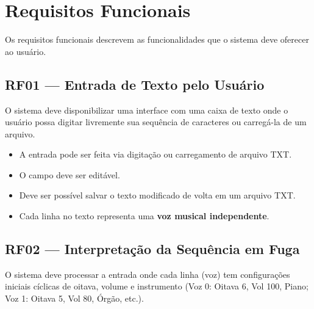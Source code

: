 \documentclass[12pt, a4paper]{article}
\begin{document}
\section{Requisitos Funcionais}

Os requisitos funcionais descrevem as funcionalidades que o sistema deve oferecer ao usuário.

\subsection{RF01 — Entrada de Texto pelo Usuário}

O sistema deve disponibilizar uma interface com uma caixa de texto onde o usuário possa digitar livremente sua sequência de caracteres ou carregá-la de um arquivo.

\begin{itemize}[leftmargin=2cm]
  \item A entrada pode ser feita via digitação ou carregamento de arquivo TXT.
  \item O campo deve ser editável.
  \item Deve ser possível salvar o texto modificado de volta em um arquivo TXT.
  \item Cada linha no texto representa uma \textbf{voz musical independente}.
\end{itemize}

\subsection{RF02 — Interpretação da Sequência em Fuga}

O sistema deve processar a entrada onde cada linha (voz) tem configurações iniciais cíclicas de oitava, volume e instrumento (Voz 0: Oitava 6, Vol 100, Piano; Voz 1: Oitava 5, Vol 80, Órgão, etc.).
\end{document}
